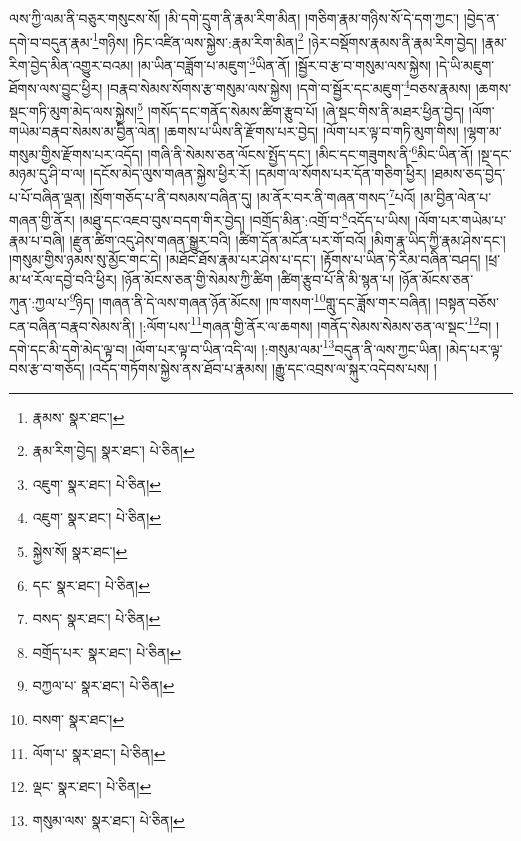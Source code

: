 ལས་ཀྱི་ལམ་ནི་བཅུར་གསུངས་སོ། །མི་དགེ་དྲུག་ནི་རྣམ་རིག་མིན། །གཅིག་རྣམ་གཉིས་སོ་དེ་དག་ཀྱང་། །བྱེད་ན་དགེ་བ་བདུན་རྣམ་\footnote{རྣམས་  སྣར་ཐང་། }གཉིས། །ཏིང་འཛིན་ལས་སྐྱེས་:རྣམ་རིག་མིན།\footnote{རྣམ་རིག་བྱེད།  སྣར་ཐང་།  པེ་ཅིན། } །ཉེར་བསྡོགས་རྣམས་ནི་རྣམ་རིག་བྱེད། །རྣམ་རིག་བྱེད་མིན་འགྱུར་བའམ། །མ་ཡིན་བཟློག་པ་མཇུག་\footnote{འཇུག་  སྣར་ཐང་།  པེ་ཅིན། }ཡིན་ནོ། །སྦྱོར་བ་རྩ་བ་གསུམ་ལས་སྐྱེས། །དེ་ཡི་མཇུག་ཐོགས་ལས་བྱུང་ཕྱིར། །བརྣབ་སེམས་སོགས་རྩ་གསུམ་ལས་སྐྱེས། །དགེ་བ་སྦྱོར་དང་མཇུག་\footnote{འཇུག་  སྣར་ཐང་།  པེ་ཅིན། }བཅས་རྣམས། །ཆགས་སྡང་གཏི་མུག་མེད་ལས་སྐྱེས།\footnote{སྐྱེས་སོ།  སྣར་ཐང་། } །གསོད་དང་གནོད་སེམས་ཚིག་རྩུབ་པོ། །ཞེ་སྡང་གིས་ནི་མཐར་ཕྱིན་བྱེད། །ལོག་གཡེམ་བརྣབ་སེམས་མ་བྱིན་ལེན། །ཆགས་པ་ཡིས་ནི་རྫོགས་པར་བྱེད། །ལོག་པར་ལྟ་བ་གཏི་མུག་གིས། །ལྷག་མ་གསུམ་གྱིས་རྫོགས་པར་འདོད། །གཞི་ནི་སེམས་ཅན་ལོངས་སྤྱོད་དང་། །མིང་དང་གཟུགས་ནི་\footnote{དང་  སྣར་ཐང་།  པེ་ཅིན། }མིང་ཡིན་ནོ། །སྔ་དང་མཉམ་དུ་ཤི་བ་ལ། །དངོས་མེད་ལུས་གཞན་སྐྱེས་ཕྱིར་རོ། །དམག་ལ་སོགས་པར་དོན་གཅིག་ཕྱིར། །ཐམས་ཅད་བྱེད་པ་པོ་བཞིན་ལྡན། །སྲོག་གཅོད་པ་ནི་བསམས་བཞིན་དུ། །མ་ནོར་བར་ནི་གཞན་གསད་\footnote{བསད་  སྣར་ཐང་།  པེ་ཅིན། }པའོ། །མ་བྱིན་ལེན་པ་གཞན་གྱི་ནོར། །མཐུ་དང་འཇབ་བུས་བདག་གིར་བྱེད། །བགྲོད་མིན་:འགྲོ་བ་\footnote{བགྲོད་པར་  སྣར་ཐང་།  པེ་ཅིན། }འདོད་པ་ཡིས། །ལོག་པར་གཡེམ་པ་རྣམ་པ་བཞི། །རྫུན་ཚིག་འདུ་ཤེས་གཞན་སྒྱུར་བའི། །ཚིག་དོན་མངོན་པར་གོ་བའོ། །མིག་རྣ་ཡིད་ཀྱི་རྣམ་ཤེས་དང་། །གསུམ་གྱིས་ཉམས་སུ་མྱོང་གང་དེ། །མཐོང་ཐོས་རྣམ་པར་ཤེས་པ་དང་། །རྟོགས་པ་ཡིན་ཏེ་རིམ་བཞིན་བཤད། །ཕྲ་མ་ཕ་རོལ་དབྱེ་བའི་ཕྱིར། །ཉོན་མོངས་ཅན་གྱི་སེམས་ཀྱི་ཚིག །ཚིག་རྩུབ་པོ་ནི་མི་སྙན་པ། །ཉོན་མོངས་ཅན་ཀུན་:ཀྱལ་པ་\footnote{བཀྱལ་པ་  སྣར་ཐང་།  པེ་ཅིན། }ཉིད། །གཞན་ནི་དེ་ལས་གཞན་ཉོན་མོངས། །ཁ་གསག་\footnote{བསག་  སྣར་ཐང་། }གླུ་དང་ཟློས་གར་བཞིན། །བསྟན་བཅོས་ངན་བཞིན་བརྣབ་སེམས་ནི། །:ལོག་པས་\footnote{ལོག་པ་  སྣར་ཐང་།  པེ་ཅིན། }གཞན་གྱི་ནོར་ལ་ཆགས། །གནོད་སེམས་སེམས་ཅན་ལ་སྡང་\footnote{ལྡང་  སྣར་ཐང་།  པེ་ཅིན། }བ། །དགེ་དང་མི་དགེ་མེད་ལྟ་བ། །ལོག་པར་ལྟ་བ་ཡིན་འདི་ལ། །:གསུམ་ལམ་\footnote{གསུམ་ལས་  སྣར་ཐང་།  པེ་ཅིན། }བདུན་ནི་ལས་ཀྱང་ཡིན། །མེད་པར་ལྟ་བས་རྩ་བ་གཅོད། །འདོད་གཏོགས་སྐྱེས་ནས་ཐོབ་པ་རྣམས། །རྒྱུ་དང་འབྲས་ལ་སྐུར་འདེབས་པས། །
